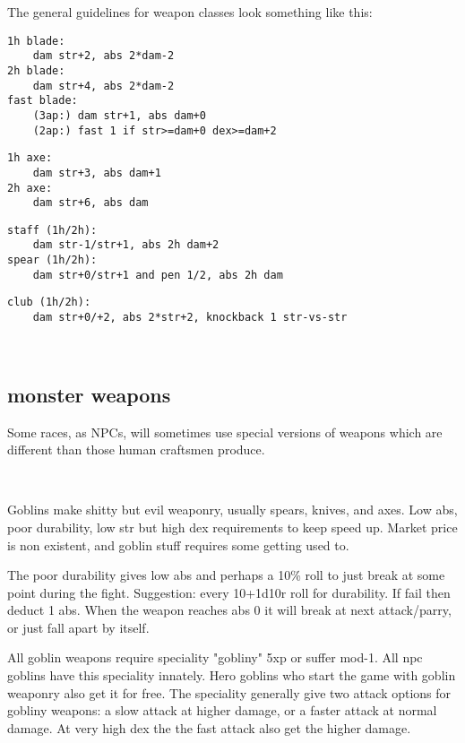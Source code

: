 The general guidelines for weapon classes look something like this:\\
\small \begin{samepage} \begin{verbatim}
1h blade:
    dam str+2, abs 2*dam-2
2h blade:
    dam str+4, abs 2*dam-2
fast blade:
    (3ap:) dam str+1, abs dam+0
    (2ap:) fast 1 if str>=dam+0 dex>=dam+2
\end{verbatim} \blocklistgap \begin{verbatim}
1h axe:
    dam str+3, abs dam+1
2h axe:
    dam str+6, abs dam
\end{verbatim} \blocklistgap \begin{verbatim}
staff (1h/2h):
    dam str-1/str+1, abs 2h dam+2
spear (1h/2h):
    dam str+0/str+1 and pen 1/2, abs 2h dam
\end{verbatim} \blocklistgap \begin{verbatim}
club (1h/2h):
    dam str+0/+2, abs 2*str+2, knockback 1 str-vs-str
\end{verbatim} \end{samepage} \normalsize \goodbreak

\


\subsection*{monster weapons}
Some races, as NPCs, will sometimes use special versions of weapons which are different than those human craftsmen produce.

\

\noindent Goblins make shitty but evil weaponry, usually spears, knives, and axes. Low abs, poor durability, low str but high dex requirements to keep speed up. Market price is non existent, and goblin stuff requires some getting used to.

The poor durability gives low abs and perhaps a 10\% roll to just break at some point during the fight. Suggestion: every 10+1d10r roll for durability. If fail then deduct 1 abs. When the weapon reaches abs 0 it will break at next attack/parry, or just fall apart by itself.

All goblin weapons require speciality "gobliny" 5xp or suffer mod-1.
All npc goblins have this speciality innately.
Hero goblins who start the game with goblin weaponry also get it for free.
The speciality generally give two attack options for gobliny weapons:
a slow attack at higher damage, or a faster attack at normal damage.
At very high dex the the fast attack also get the higher damage.

